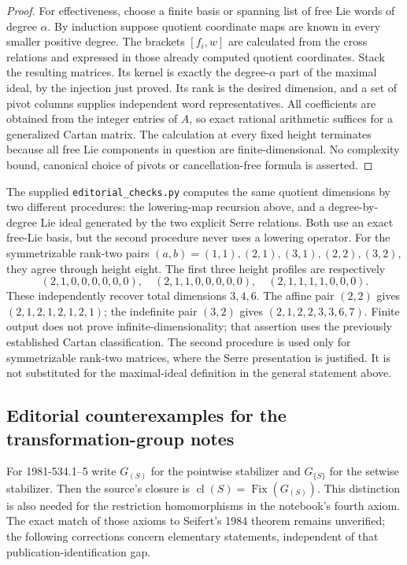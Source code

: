 \begin{proof}
For effectiveness, choose a finite basis or spanning list of free Lie words of degree \(\alpha\). By induction suppose quotient coordinate maps are known in every smaller positive degree. The brackets \([f_i,w]\) are calculated from the cross relations and expressed in those already computed quotient coordinates. Stack the resulting matrices. Its kernel is exactly the degree-\(\alpha\) part of the maximal ideal, by the injection just proved. Its rank is the desired dimension, and a set of pivot columns supplies independent word representatives. All coefficients are obtained from the integer entries of \(A\), so exact rational arithmetic suffices for a generalized Cartan matrix. The calculation at every fixed height terminates because all free Lie components in question are finite-dimensional. No complexity bound, canonical choice of pivots or cancellation-free formula is asserted.
\end{proof}

\begin{remark}\oursComputed
The supplied \texttt{editorial\_checks.py} computes the same quotient dimensions by two different procedures: the lowering-map recursion above, and a degree-by-degree Lie ideal generated by the two explicit Serre relations. Both use an exact free-Lie basis, but the second procedure never uses a lowering operator. For the symmetrizable rank-two pairs \((a,b)=(1,1),(2,1),(3,1),(2,2),(3,2)\), they agree through height eight. The first three height profiles are respectively
\[
 (2,1,0,0,0,0,0,0),\quad
 (2,1,1,0,0,0,0,0),\quad
 (2,1,1,1,1,0,0,0).
\]
These independently recover total dimensions \(3,4,6\). The affine pair \((2,2)\) gives \((2,1,2,1,2,1,2,1)\); the indefinite pair \((3,2)\) gives \((2,1,2,2,3,3,6,7)\). Finite output does not prove infinite-dimensionality; that assertion uses the previously established Cartan classification. The second procedure is used only for symmetrizable rank-two matrices, where the Serre presentation is justified. It is not substituted for the maximal-ideal definition in the general statement above.
\end{remark}

\subsection{Editorial counterexamples for the transformation-group notes}

For 1981-534.1--5 write \(G_{(S)}\) for the pointwise stabilizer and \(G_{\{S\}}\) for the setwise stabilizer. Then the source's closure is
\(
 \operatorname{cl}(S)=\operatorname{Fix}(G_{(S)}).
\)
This distinction is also needed for the restriction homomorphisms in the notebook's fourth axiom. The exact match of those axioms to Seifert's 1984 theorem remains unverified; the following corrections concern elementary statements, independent of that publication-identification gap.

